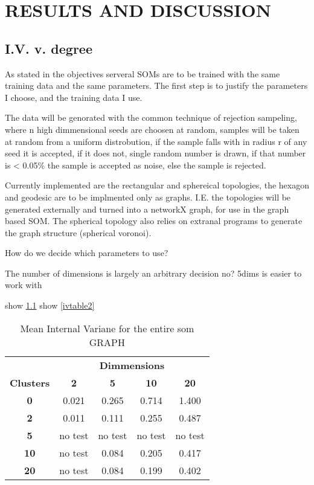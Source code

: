 \chapter{RESULTS AND DISCUSSION}



\section{I.V. v. degree}

As stated in the objectives serveral SOMs are to be trained with the same
training data and the same parameters.  The first step is to justify the
parameters I choose, and the training data I use.

The data will be genorated with the common technique of rejection sampeling,
where n high dimmensional seeds are choosen at random, samples will be taken
at random from a uniform distrobution, if the sample falls with in radius r of
any seed it is accepted, if it does not, single random number is drawn, if that
number is < 0.05\% the sample is accepted as noise, else the sample is rejected.

Currently implemented are the rectangular and sphereical topologies, the hexagon
and geodesic are to be implmented only as graphs.  I.E. the topologies will be
generated externally and turned into a networkX graph, for use in the graph
based SOM. The spherical topology also relies on extranal programs to generate
the graph structure (spherical voronoi).

How do we decide which parameters to use?

The number of dimensions is largely an arbitrary decision no?
5dims is easier to work with

show \ref{ivtable1}
show \ref{ivtable2}

\begin{table}
\caption{Mean Internal Variane for the entire som GRAPH}
\label{ivtable1}
\begin{tabular}{|c||c|c|c|c|}
\hline
&\multicolumn{4}{c|}{\textbf{Dimmensions}}\\
\textbf{Clusters} & \multicolumn{1}{c}{\textbf{2}} &
\multicolumn{1}{c}{\textbf{5}} & \multicolumn{1}{c}{\textbf{10}} &
\multicolumn{1}{c|}{\textbf{20}}\\
\hline
\hline
\textbf{0} & 0.021& 0.265& 0.714& 1.400 \\
\hline
\textbf{2} & 0.011& 0.111& 0.255& 0.487 \\
\hline
\textbf{5} & no test& no test& no test& no test \\
\hline
\textbf{10} & no test& 0.084& 0.205& 0.417 \\
\hline
\textbf{20} & no test& 0.084& 0.199& 0.402 \\
\hline
\end{tabular} \end{table}

